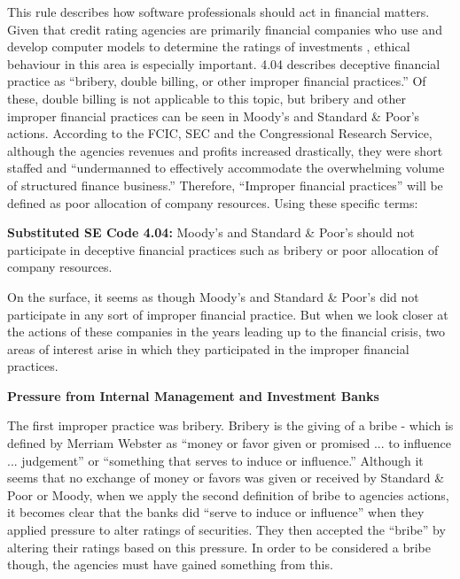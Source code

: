 \documentclass[11pt]{article}
\begin{document}
\begin{multicols}{2}
This rule describes how software professionals should act in financial matters.  Given that credit rating agencies are primarily financial companies who use and develop computer models to determine the ratings of investments \cite[p.11]{govtReport}, ethical behaviour in this area is especially important.  
4.04 describes deceptive financial practice as ``bribery, double billing, or other improper financial practices.''  Of these, double billing is not applicable to this topic, but bribery and other improper financial practices can be seen in Moody's and Standard \& Poor's actions.  According to the FCIC, SEC and the Congressional Research Service, although the agencies revenues and profits increased drastically, they were short staffed and ``undermanned to effectively accommodate the overwhelming volume of structured finance business.'' \cite[p. 7]{CRS, govtReport, secCRAreport} Therefore, ``Improper financial practices'' will be defined as poor allocation of company resources.  
Using these specific terms:


\begin{framed}
\noindent
   \textbf{Substituted SE Code 4.04: } 
   \newline
   Moody's and Standard \& Poor's should not participate in deceptive financial practices such as bribery or poor allocation of company resources.
\end{framed}


On the surface, it seems as though Moody's and Standard \& Poor's did not participate in any sort of improper financial practice.  But when we look closer at the actions of these companies in the years leading up to the financial crisis, two areas of interest arise in which they participated in the improper financial practices.  

\textbf{Pressure from Internal Management and Investment Banks}

The first improper practice was bribery.  Bribery is the giving of a bribe - which is defined by Merriam Webster as ``money or favor given or promised ... to influence ... judgement'' or ``something that serves to induce or influence.'' \cite{bribeDef}  Although it seems that no exchange of money or favors was given or received by Standard \& Poor or Moody, when we apply the second definition of bribe to agencies actions, it becomes clear that the banks did ``serve to induce or influence'' when they applied pressure to alter ratings of securities.  They then accepted the ``bribe'' by altering their ratings based on this pressure.  In order to be considered a bribe though, the agencies must have gained something from this.


\end{multicols}
\end{document}
